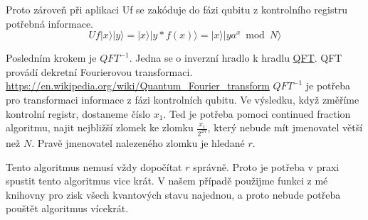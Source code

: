 \documentclass[11pt]{article}
\begin{document}
Proto zároveň při aplikaci Uf se zakóduje do fázi qubitu z kontrolního registru potřebná informace.
$$Uf|x\rangle|y\rangle = |x\rangle|y*f(x)\rangle = |x\rangle|ya^x \bmod N \rangle$$
\par Posledním krokem je $QFT^{-1}$.
Jedna se o inverzní hradlo k hradlu \hyperref[sec:qft]{QFT}.
QFT provádí dekretní Fourierovou transformaci.
\url{https://en.wikipedia.org/wiki/Quantum_Fourier_transform}
$QFT^{-1}$ je potřeba pro transformaci informace z fázi kontrolních qubitu.
Ve výsledku, když změříme kontrolní registr, dostaneme číslo $x_1$.
Ted je potřeba pomoci continued fraction algoritmu, najit nejbližší zlomek ke zlomku $\frac{x_1}{2^{2n}}$, který nebude mít jmenovatel větší než $N$.
Pravě jmenovatel nalezeného zlomku je hledané $r$.
\par Tento algoritmus nemusí vždy dopočítat $r$ správně.
Proto je potřeba v praxi spustit tento algoritmus vice krát.
V našem případě použijme funkci z mé knihovny pro zisk všech kvantových stavu najednou, a proto nebude potřeba pouštět algoritmus vícekrát.
\end{document}
